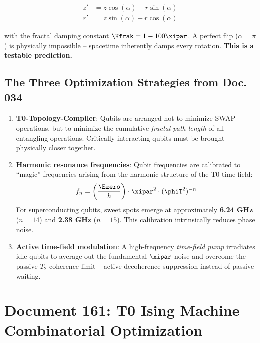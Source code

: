\begin{align}
    z' &= z \cos(\alpha) - r \sin(\alpha) \\
    r' &= z \sin(\alpha) + r \cos(\alpha)
\end{align}

with the fractal damping constant $\Kfrak = 1 - 100\xipar$.
A perfect flip ($\alpha = \pi$) is physically impossible -- spacetime inherently
damps every rotation. \textbf{This is a testable prediction.}

\subsection{The Three Optimization Strategies from Doc. 034}

\begin{enumerate}
    \item \textbf{T0-Topology-Compiler}: Qubits are arranged not to minimize SWAP
    operations, but to minimize the cumulative \emph{fractal path length} of all
    entangling operations. Critically interacting qubits must be brought physically
    closer together.

    \item \textbf{Harmonic resonance frequencies}: Qubit frequencies are calibrated
    to ``magic'' frequencies arising from the harmonic structure of the T0 time field:
    \begin{equation}
        f_n = \left(\frac{\Ezero}{h}\right) \cdot \xipar^2 \cdot (\phiT^2)^{-n}
        \label{eq:harmonic_freq}
    \end{equation}
    For superconducting qubits, sweet spots emerge at approximately \textbf{6.24 GHz}
    ($n=14$) and \textbf{2.38 GHz} ($n=15$). This calibration intrinsically reduces
    phase noise.

    \item \textbf{Active time-field modulation}: A high-frequency
    \emph{time-field pump} irradiates idle qubits to average out the fundamental
    $\xipar$-noise and overcome the passive $T_2$ coherence limit -- active
    decoherence suppression instead of passive waiting.
\end{enumerate}

\clearpage

\section{Document 161: T0 Ising Machine -- Combinatorial Optimization}
\label{sec:doc161}

